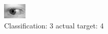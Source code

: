 \begin{figure}[h!]
\begin{center}
\includegraphics[width=0.60\columnwidth]{figures/ID690_class_3_target_4.png}
\end{center}
\caption{ Classification: 3 actual target: 4}
\label{fig:ID690_class_3_target_4}
\end{figure}
